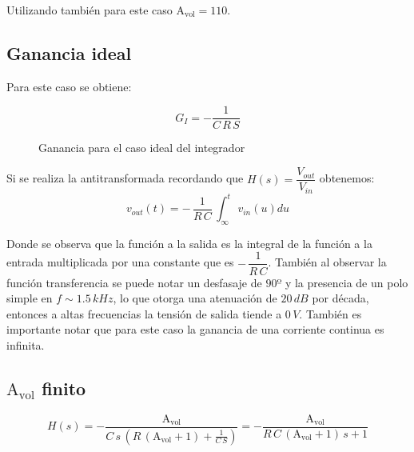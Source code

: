 Utilizando también para este caso $\mathrm{A_{vol}}=110$.

\subsection{Ganancia ideal} \label{gananciaidealintegrador}
Para este caso se obtiene:

\begin{equation}
G_I=-\dfrac{1}{C\,R\,S}
\end{equation}

\begin{center}
	\begin{figure}[H]	
	\caption{Ganancia para el caso ideal del integrador}
	\label{fig:avolidealintegrador}
	\end{figure}
\end{center}

Si se realiza la antitransformada recordando que $H(s)= \dfrac{V_{out}}{V_{in}}$ obtenemos:
\begin{equation} 
v_{out} (t) = - \, \dfrac{1}{R \,C} \,  \int_{\infty}^t v_{in}(u) du
\end{equation}

Donde se observa que la función a la salida es la integral de la función a la entrada multiplicada por una constante que es $- \, \dfrac{1}{R \,C}$. También al observar la función transferencia se puede notar un desfasaje de $90º$ y la presencia de un polo simple en $f \sim 1.5 \,kHz$, lo que otorga una atenuación de $20 \, dB$ por década, entonces a altas frecuencias la tensión de salida tiende a $0 \,V$. 
También es importante notar que para este caso la ganancia de una corriente continua es infinita.

\subsection{$\mathrm{A_{vol}}$ finito}
\begin{equation}
H(s)=- \dfrac{\mathrm{A_{vol}}}{C\,s\,\left(R\,\left(\mathrm{A_{vol}}+1 \right) + \frac{1}{C\,S}\right)} = -\dfrac{\mathrm{A_{vol}}}{R\,C\,\left( \mathrm{A_{vol}} + 1 \right)\,s + 1}
\end{equation}


